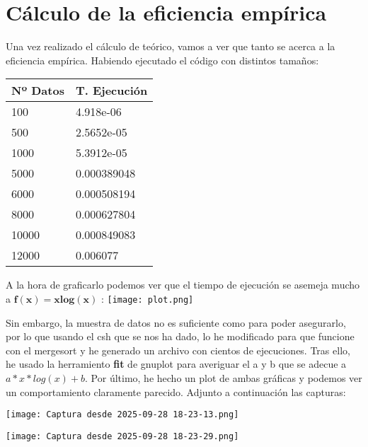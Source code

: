\documentclass{article}
\begin{document}
\newpage
\section{Cálculo de la eficiencia empírica}
Una vez realizado el cálculo de teórico, vamos a ver que tanto se acerca a la eficiencia empírica.
Habiendo ejecutado el código con distintos tamaños:
\begin{center}
\begin{tabular}{|p{4cm}|p{4cm}|}
    \hline
    Nº Datos & T. Ejecución \\
    \hline
    100 & 4.918e-06 \\
    \hline
    500 & 2.5652e-05 \\
    \hline
    1000 & 5.3912e-05 \\
    \hline
    5000 & 0.000389048 \\
    \hline
    6000 & 0.000508194 \\
    \hline
    8000 & 0.000627804 \\
    \hline
    10000 & 0.000849083 \\
    \hline
    12000 & 0.006077 \\
    \hline
\end{tabular}

A la hora de graficarlo podemos ver que el tiempo de ejecución se asemeja mucho a $\mathbf{f(x)=xlog(x)}$ :
 \texttt{[image: plot.png]}
    \end{center}

Sin embargo, la muestra de datos no es suficiente como para poder asegurarlo, por lo que usando el csh que se nos ha dado, lo he modificado para que funcione con el mergesort y he generado un archivo con cientos de ejecuciones. Tras ello, he usado la herramiento \textbf{fit} de gnuplot para averiguar el a y b que se adecue a $a*x*log(x)+b$. Por último, he hecho un plot de ambas gráficas y podemos ver un comportamiento claramente parecido. Adjunto a continuación las capturas:

\texttt{[image: Captura desde 2025-09-28 18-23-13.png]}

\texttt{[image: Captura desde 2025-09-28 18-23-29.png]}
\end{document}
